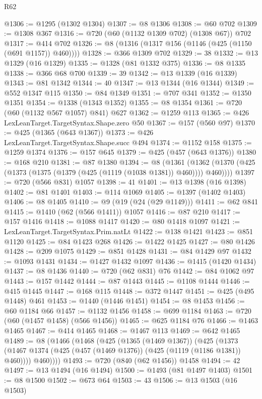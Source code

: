 \begin{lexlean}{R62}
\begin{coremodule}
@1306 := @1295 (@1302 @1304)
@1307 := @8 @1306
@1308 := @60 @702
@1309 := @1308 @367
@1316 := @720 (@60 (@1132 @1309 @702) (@1308 @67)) @702
@1317 := @414 @702
@1326 := @8 (@1316 (@1317 @156 (@1146 (@425 (@1150 (@691 @1157)) @460))))
@1328 := @366 @1309 @702
@1329 := 38
@1332 := @13 @1329 (@16 @1329)
@1335 := @1328 (@81 @1332 @375)
@1336 := @8 @1335
@1338 := @366 @68 @700
@1339 := 39
@1342 := @13 @1339 (@16 @1339)
@1343 := @81 @1342
@1344 := 40
@1347 := @13 @1344 (@16 @1344)
@1349 := @552 @1347 @115
@1350 := @84 @1349
@1351 := @707 @341
@1352 := @1350 @1351
@1354 := @1338 (@1343 @1352)
@1355 := @8 @1354
@1361 := @720 (@60 (@1132 @567 @1057) @841) @627
@1362 := @1259 @113
@1365 := @426 LexLeanTarget.TargetSyntax.Shape.zero @50
@1367 := @157 (@560 @97)
@1370 := @425 (@1365 (@643 @1367))
@1373 := @426 LexLeanTarget.TargetSyntax.Shape.succ @494
@1374 := @1152 @158
@1375 := @1259 @1374
@1376 := @157 @645
@1379 := @425 (@457 (@643 @1376))
@1380 := @168 @210
@1381 := @87 @1380
@1394 := @8
    (@1361 (@1362 (@1370 (@425 (@1373 (@1375 (@1379 (@425 (@1119 (@1038 @1381)) @460)))) @460))))
@1397 := @720 (@566 @831) @1057
@1398 := 41
@1401 := @13 @1398 (@16 @1398)
@1402 := @81 @1401
@1403 := @114 @1069
@1405 := @1397 (@1402 @1403)
@1406 := @8 @1405
@1410 := @9 (@19 (@24 (@29 @1149)))
@1411 := @62 @841
@1415 := @1410 (@62 (@566 @1411)) @1057
@1416 := @87 @210
@1417 := @157 @1416
@1418 := @1088 @1417
@1420 := @80 @1418 @1097
@1421 := LexLeanTarget.TargetSyntax.Prim.natLt
@1422 := @138 @1421
@1423 := @851 @1120
@1425 := @84 @1423 @268
@1426 := @1422 @1425
@1427 := @80 @1426
@1428 := @209 @1075
@1429 := @851 @1428
@1431 := @84 @1429 @97
@1432 := @1093 @1431
@1434 := @1427 @1432 @1097
@1436 := @1415 (@1420 @1434)
@1437 := @8 @1436
@1440 := @720 (@62 @831) @76
@1442 := @84 @1062 @97
@1443 := @157 @1442
@1444 := @87 @1443
@1445 := @1108 @1444
@1446 := @415 @1445
@1447 := @168 @115
@1448 := @372 @1447
@1451 := @425 (@495 @1448) @461
@1453 := @1440 (@1446 @1451)
@1454 := @8 @1453
@1456 := @60 @1184 @66
@1457 := @1132 @1456
@1458 := @699 @1184
@1463 := @720 (@60 (@1457 @1458) (@566 @1456))
@1465 := @625 @1184 @76
@1466 := @1463 @1465
@1467 := @414 @1465
@1468 := @1467 @113
@1469 := @642 @1465
@1489 := @8
    (@1466
      (@1468
        (@425
          (@1365 (@1469 @1367))
          (@425
            (@1373 (@1467 @1374 (@425 (@457 (@1469 @1376)) (@425 (@1119 (@1186 @1381)) @460))))
            @460))))
@1493 := @720 (@840 (@62 @1456)) @1458
@1494 := 42
@1497 := @13 @1494 (@16 @1494)
@1500 := @1493 (@81 @1497 @1403)
@1501 := @8 @1500
@1502 := @673 @64
@1503 := 43
@1506 := @13 @1503 (@16 @1503)

\end{coremodule}
\end{lexlean}
